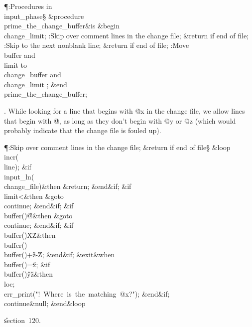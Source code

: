 \Y\P\?\4:Procedures in \\{input\_phase}\X\mathrel{+}\S\?\6
\&{procedure}\8\1\\{prime\_the\_change\_buffer}\2\8\&{is}\8\1\6
\4\&{begin}\6
\\{change\_limit}\?\K{};\6
:Skip over comment lines in the change file; \&{return} if end of file\X;\6
:Skip to the next nonblank line; \&{return} if end of file\X;\6
:Move \\{buffer} and \\{limit} to \\{change\_buffer} and \\{change\_limit}%
\X;\2\6
\&{end}\8\\{prime\_the\_change\_buffer};\par
\fi

. While looking for a line that begins with \.{@x} in the change file,
we allow lines that begin with \.{@}, as long as they don't begin with
\.{@y} or \.{@z} (which would probably indicate that the change file is
fouled up).

\Y\P\?\4:Skip over comment lines in the change file; \&{return} if end of
file\X\S\?\6
\1\&{loop}\6
\\{incr}\?\1(\?\\{line}\?\2)\?;\6
\&{if}\1\1\?\8\R\?\\{input\_ln}\?\1(\?\\{change\_file}\?\2)\?\2\8\&{then}\6
\&{return};\2\6
\&{end}\8\2\&{if}\1;\6
\&{if}\1\1\8\\{limit}\?<\2\8\&{then}\6
\&{goto}\8\\{continue};\2\6
\&{end}\8\2\&{if}\1;\6
\&{if}\1\1\8\\{buffer}\?\1(\?\2)\I\?\H{@}\2\8\&{then}\6
\&{goto}\8\\{continue};\2\6
\&{end}\8\2\&{if}\1;\6
\&{if}\1\1\8\\{buffer}\?\1(\?\2)\in\?\H{X}\?\to\?\H{Z}\2\8\&{then}\6
\\{buffer}\?\1(\?\2)\K\?\\{buffer}\?\1(\?\2)+\?\H{z}\?-\?\H{Z};%
\2\6
\&{end}\8\2\&{if}\1;\6
\?\&{exit}\8\&{when}\?\8\\{buffer}\?\1(\?\2)=\?\H{x};\6
\&{if}\1\1\8\\{buffer}\?\1(\?\2)\in\?\H{y}\?\to\?\H{z}\2\8\&{then}\6
\\{loc}\?\K{};\5
\\{err\_print}\?\1(\?\.{"!\ Where\ is\ the\ matching\ @x?"}\?\2)\?;\2\6
\&{end}\8\2\&{if}\1;\6
\4\BL\\{continue}\EL\8\&{null};\2\6
\&{end}\8\&{loop}\par
\U section~120.\fi


